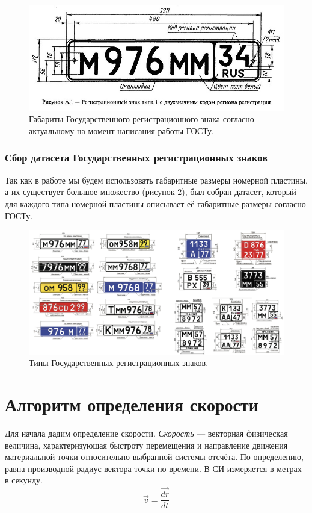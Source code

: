\documentclass[specification,annotation,times]{itmo-student-thesis}
\begin{document}
\begin{figure}[!ht]
	\caption{Габариты Государственного регистрационного знака согласно актуальному на момент написания работы ГОСТу.}\label{img:licnum-gost}
	\includegraphics[width=0.85\linewidth]{../png/licnum1.jpeg}
	\centering
\end{figure}

\subsubsection{Сбор датасета Государственных регистрационных знаков}
Так как в работе мы будем использовать габаритные размеры номерной пластины, а их существует большое множество (рисунок \ref{img:plates}), был собран датасет, который для каждого типа номерной пластины описывает её габаритные размеры согласно ГОСТу.

\begin{figure}[!ht]
	\caption{Типы Государственных регистрационных знаков.}\label{img:plates}
	\includegraphics[width=0.85\linewidth]{../png/plates.png}
	\centering
\end{figure}

\section{Алгоритм определения скорости}
Для начала дадим определение скорости. \textit{Скорость} ---  векторная физическая величина, характеризующая быстроту перемещения и направление движения материальной точки относительно выбранной системы отсчёта. По определению, равна производной радиус-вектора точки по времени. В СИ измеряется в метрах в секунду.
\begin{equation}
\mathit{\vec{v}=\frac{\vec{dr}} {dt}}
\label{eq:v}
\end{equation}
\end{document}
